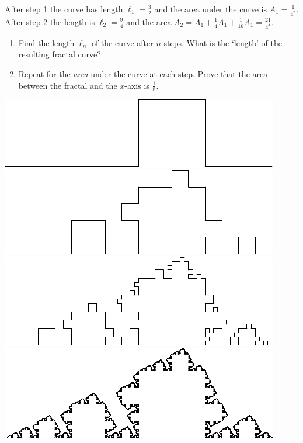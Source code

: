 \begin{exercises}{}{}
\begin{enumerate}
\begin{enumerate}
\begin{minipage}[t]{0.61\linewidth}
	    After step 1 the curve has length $\ell_1=\frac 32$ and the area under the curve is $A_1=\frac 1{4^2}$. After step 2 the length is $\ell_2=\frac 94$ and the area $A_2=A_1+\frac 14A_1+\frac 1{16}A_1 =\frac{21}{4^4}$. 
	    \begin{enumerate}
	      \item Find the length $\ell_n$ of the curve after $n$ steps. What is the `length' of the resulting fractal curve?
	      \item Repeat for the \emph{area} under the curve at each step. Prove that the area between the fractal and the $x$-axis is $\frac 18$.
	    \end{enumerate}
	    \end{minipage}
	    \hfill
	    \begin{minipage}[t]{0.38\linewidth}\vspace{-5pt}
	    \flushright
	    	\includegraphics[scale=0.7]{fractal1}
	    	\\
	    	\includegraphics[scale=0.7]{fractal2}
	    	\\
	    	\includegraphics[scale=0.7]{fractal3}
	    	\\
	    	\includegraphics[scale=0.7]{fractal}
	    \end{minipage}
		\end{enumerate}
	

\end{enumerate}
\end{exercises}
